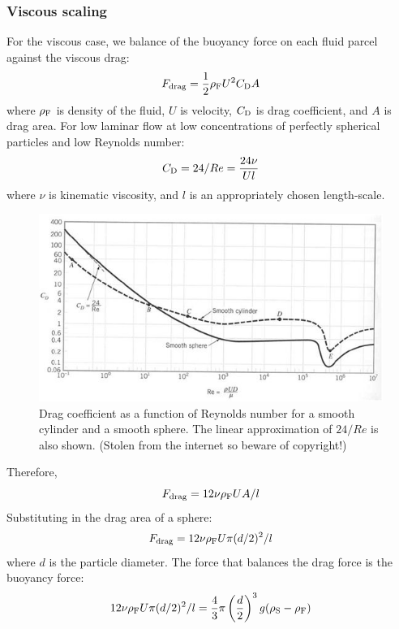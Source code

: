 \subsubsection{Viscous scaling}
For the viscous case, we balance of the buoyancy force on each fluid parcel against the viscous drag:
\begin{equation}
F_{\rm drag} = \frac{1}{2} \rho_{\rm F} U^2 C_{\rm D} A
\end{equation}
where $\rho_{\rm F}$ is density of the fluid, $U$ is velocity, $C_{\rm D}$ is drag coefficient, and $A$ is drag area.
For low laminar flow at low concentrations of perfectly spherical particles and low Reynolds number:
\begin{equation}
C_{\rm D} = 24 / Re = \frac{24 \nu}{U l}
\end{equation}
where $\nu$ is kinematic viscosity, and $l$ is an appropriately chosen length-scale.
\begin{figure}[!bthp]
\centering
\includegraphics[width=1.0\textwidth]{figs/Shape_CoefficientC.jpg}
\caption{Drag coefficient as a function of Reynolds number for a smooth cylinder and a smooth sphere.  The linear approximation of $24/Re$ is also shown.  (Stolen from the internet so beware of copyright!)}
\end{figure}
Therefore,
\begin{equation}
F_{\rm drag} = 12 \nu \rho_{\rm F} U A / l
\end{equation}
Substituting in the drag area of a sphere:
\begin{equation}
F_{\rm drag} = 12 \nu \rho_{\rm F} U \pi (d/2)^2 / l
\end{equation}
where $d$ is the particle diameter.
The force that balances the drag force is the buoyancy force:
\begin{equation}
12 \nu \rho_{\rm F} U \pi (d/2)^2 / l = \frac{4}{3} \pi \left(\frac{d}{2}\right)^3 g (\rho_{\rm S} - \rho_{\rm F})
\end{equation}
